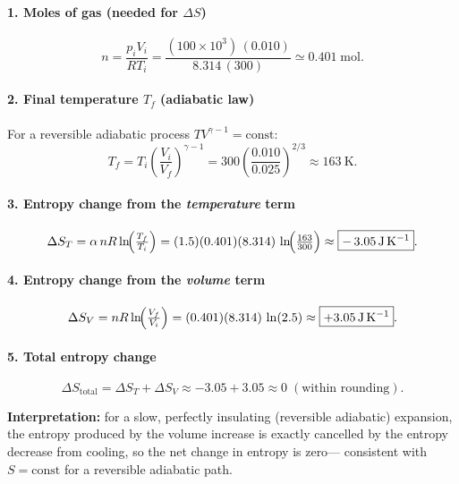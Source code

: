 \documentclass[12pt]{article}
\theoremstyle{definition} %
\theoremstyle{plain} %
\begin{document}
\paragraph{1.  Moles of gas (needed for \(\Delta S\))}
\[
  n
  = \frac{p_i V_i}{RT_i}
  = \frac{(100\times10^{3})\,(0.010)}
         {8.314\,(300)}
  \simeq 0.401\;\text{mol}.
\]

\paragraph{2.  Final temperature \(T_f\) (adiabatic law)}
For a reversible adiabatic process
\(T V^{\gamma-1} = \text{const}\):
\[
  T_f
  = T_i \!\left(\frac{V_i}{V_f}\right)^{\gamma-1}
  = 300 \left(\frac{0.010}{0.025}\right)^{2/3}
  \approx \boxed{\SI{163}{\kelvin}}.
\]

\paragraph{3.  Entropy change from the \emph{temperature} term}
\[
  \Delta S_T
  = \alpha\,nR \ln\!\Bigl(\tfrac{T_f}{T_i}\Bigr)
  = (1.5)(0.401)(8.314)\,\ln\!\Bigl(\tfrac{163}{300}\Bigr)
  \approx \boxed{-\,\SI{3.05}{\joule\per\kelvin}}.
\]

\paragraph{4.  Entropy change from the \emph{volume} term}
\[
  \Delta S_V
  = nR \ln\!\Bigl(\tfrac{V_f}{V_i}\Bigr)
  = (0.401)(8.314)\,\ln(2.5)
  \approx \boxed{+\SI{3.05}{\joule\per\kelvin}}.
\]

\paragraph{5.  Total entropy change}
\[
  \Delta S_{\text{total}}
  = \Delta S_T + \Delta S_V
  \approx -3.05 + 3.05
  \approx \boxed{0\;(\text{within rounding})}.
\]

\noindent
\textbf{Interpretation:} for a slow, perfectly insulating (reversible adiabatic)
expansion, the entropy produced by the volume increase is exactly cancelled
by the entropy decrease from cooling, so the net change in entropy is zero—
consistent with \(S = \text{const}\) for a reversible adiabatic path.
\end{document}
